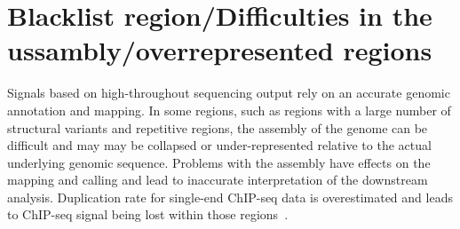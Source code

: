 \section{Blacklist region/Difficulties in the ussambly/overrepresented regions}

Signals based on high-throughout sequencing output rely on an accurate genomic annotation and mapping.
In some regions, such as regions with a large number of structural variants and repetitive regions, the assembly of the genome can be difficult and may may be collapsed or under-represented relative to the actual underlying genomic sequence.
Problems with the assembly have effects on the mapping and calling and lead to inaccurate interpretation of the downstream analysis.
Duplication rate for single-end ChIP-seq data is overestimated and leads to ChIP-seq signal being lost within those regions~\cite{chen2012systematic}.
